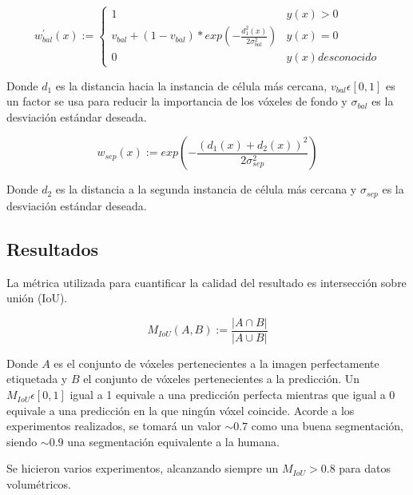 \begin{equation}
w^{'}_{bal}(x):= \left \{ \begin{matrix} 1 & y(x)>0
\\ v_{bal}+(1-v_{bal})*exp(-\frac{d^2_1(x)}{2\sigma^2_{bal}}) & y(x)=0
\\ 0 & y(x) desconocido \end{matrix}\right. 
\end{equation}

Donde $d_1$ es la distancia hacia la instancia de célula más cercana, $v_{bal}\epsilon [0,1]$ es un factor se usa para reducir la importancia de los vóxeles de fondo y $\sigma_{bal}$ es la desviación estándar deseada.

\begin{equation}
w_{sep}(x) := exp(-\frac{(d_1(x)+d_2(x))^2}{2\sigma_{sep}^2})
\end{equation}

Donde $d_2$ es la distancia a la segunda instancia de célula más cercana y $\sigma_{sep}$ es la desviación estándar deseada. 


\subsection{Resultados}\label{app1_results}


La métrica utilizada para cuantificar la calidad del resultado es intersección sobre unión (IoU).

\begin{equation}
M_{IoU}(A, B) := \frac{|A\cap B|}{|A\cup B|}
\end{equation}

Donde $A$ es el conjunto de vóxeles pertenecientes a la imagen perfectamente etiquetada y $B$ el conjunto de vóxeles pertenecientes a la predicción. Un $M_{IoU}\epsilon[0,1]$ igual a 1 equivale a una predicción perfecta mientras que igual a 0 equivale a una predicción en la que ningún vóxel coincide.
Acorde a los experimentos realizados, se tomará un valor $\sim0.7$ como una buena segmentación, siendo $\sim0.9$ una segmentación equivalente a la humana.

Se hicieron varios experimentos, alcanzando siempre un $M_{IoU}>0.8$ para datos volumétricos.

